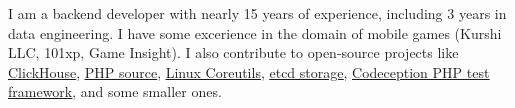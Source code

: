 I am a backend developer with nearly 15 years of experience, including 3 years
in data engineering. I have some excerience in the domain of mobile games
(Kurshi LLC, 101xp, Game Insight). I
also contribute to open-source projects like
\href{https://github.com/ClickHouse/ClickHouse/pulls?q=is\%3Apr+is\%3Aclosed+author\%3AGSokol}{\underline{ClickHouse}},
\href{https://github.com/php/php-src/pulls?q=is\%3Apr+is\%3Aclosed+author\%3AGSokol}{\underline{PHP source}},
\href{https://github.com/coreutils/coreutils/commits?author=GSokol}{\underline{Linux Coreutils}},
\href{https://github.com/etcd-io/etcd/pulls?q=is\%3Apr+is\%3Aclosed+author\%3AGSokol}{\underline{etcd storage}},
\href{https://github.com/Codeception/Codeception/pulls?q=is\%3Apr+is\%3Aclosed+author\%3AGSokol}{\underline{Codeception PHP test framework}},
and some smaller ones.

